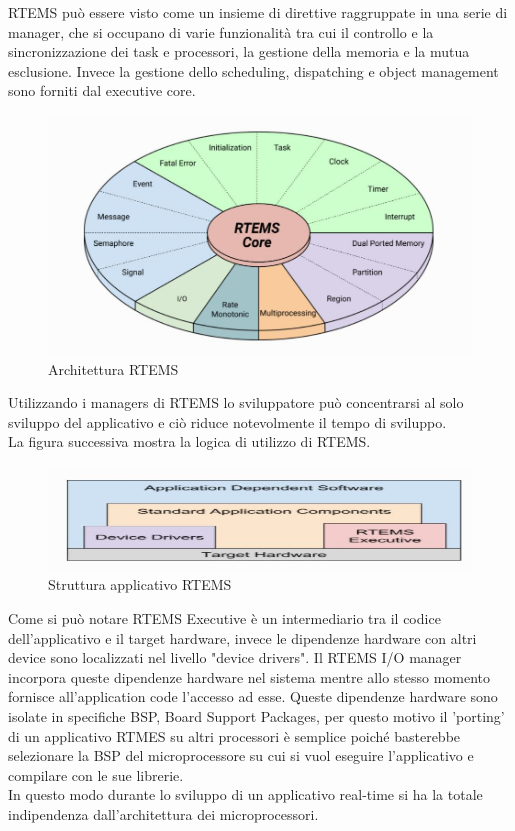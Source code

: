 \documentclass[12pt, a4paper, titlepage, oneside]{book}
\begin{document}
\begin{flushleft}
\newpage
RTEMS può essere visto come un insieme di direttive raggruppate in una serie di manager, che si occupano di varie funzionalità tra cui il controllo e la sincronizzazione dei task e processori, la gestione della memoria e la mutua esclusione. Invece la gestione dello scheduling, dispatching e object management sono forniti dal executive core.
\begin{figure} [h]
    \centering
    \includegraphics[scale = 0.80]{rtems_internal_architecture.JPG}
    \caption{Architettura RTEMS}
    \label{fig:my_label1}
\end{figure}

Utilizzando i managers di RTEMS lo sviluppatore può concentrarsi al solo sviluppo del applicativo e ciò riduce notevolmente il tempo di sviluppo.\\

La figura successiva mostra la logica di utilizzo di RTEMS.
\begin{figure}[ht]
    \centering
    \includegraphics[scale = 0.80]{application_architecture.JPG}
    \caption{Struttura applicativo RTEMS}
    \label{fig:my_label2}
\end{figure}

Come si può notare RTEMS Executive è un intermediario tra il codice dell'applicativo e il target hardware, invece le dipendenze hardware con altri device sono localizzati nel livello "device drivers".
Il RTEMS I/O manager incorpora queste dipendenze hardware nel sistema mentre allo stesso momento fornisce all'application code l'accesso ad esse.
Queste dipendenze hardware sono isolate in specifiche BSP, Board Support Packages, per questo motivo il 'porting' di un applicativo RTMES su altri processori è semplice poiché basterebbe selezionare la BSP del microprocessore su cui si vuol eseguire l'applicativo e compilare con le sue librerie.\\
In questo modo durante lo sviluppo di un applicativo real-time si ha la totale indipendenza dall'architettura dei microprocessori. \\


\end{flushleft}
\end{document}
